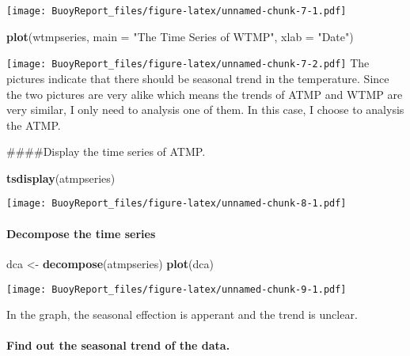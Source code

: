 \documentclass[]{article}
\newenvironment{Shaded}{\begin{snugshade}}{\end{snugshade}}
\newcommand{\DataTypeTok}[1]{\textcolor[rgb]{0.13,0.29,0.53}{#1}}
\newcommand{\KeywordTok}[1]{\textcolor[rgb]{0.13,0.29,0.53}{\textbf{#1}}}
\newcommand{\NormalTok}[1]{#1}
\newcommand{\StringTok}[1]{\textcolor[rgb]{0.31,0.60,0.02}{#1}}
\let\oldparagraph\paragraph
\renewcommand{\paragraph}[1]{\oldparagraph{#1}\mbox{}}
\begin{document}
\texttt{[image: BuoyReport\_files/figure-latex/unnamed-chunk-7-1.pdf]}

\begin{Shaded}
\begin{Highlighting}[]
\KeywordTok{plot}\NormalTok{(wtmpseries, }\DataTypeTok{main =} \StringTok{"The Time Series of WTMP"}\NormalTok{, }\DataTypeTok{xlab =} \StringTok{"Date"}\NormalTok{)}
\end{Highlighting}
\end{Shaded}

\texttt{[image: BuoyReport\_files/figure-latex/unnamed-chunk-7-2.pdf]}
The pictures indicate that there should be seasonal trend in the
temperature. Since the two pictures are very alike which means the
trends of ATMP and WTMP are very similar, I only need to analysis one of
them. In this case, I choose to analysis the ATMP.

\#\#\#\#Display the time series of ATMP.

\begin{Shaded}
\begin{Highlighting}[]
\KeywordTok{tsdisplay}\NormalTok{(atmpseries)}
\end{Highlighting}
\end{Shaded}

\texttt{[image: BuoyReport\_files/figure-latex/unnamed-chunk-8-1.pdf]}

\hypertarget{decompose-the-time-series}{%
\paragraph{Decompose the time series}\label{decompose-the-time-series}}

\begin{Shaded}
\begin{Highlighting}[]
\NormalTok{dca <-}\StringTok{ }\KeywordTok{decompose}\NormalTok{(atmpseries)}
\KeywordTok{plot}\NormalTok{(dca)}
\end{Highlighting}
\end{Shaded}

\texttt{[image: BuoyReport\_files/figure-latex/unnamed-chunk-9-1.pdf]}

In the graph, the seasonal effection is apperant and the trend is
unclear.

\hypertarget{find-out-the-seasonal-trend-of-the-data.}{%
\paragraph{Find out the seasonal trend of the
data.}\label{find-out-the-seasonal-trend-of-the-data.}}
\end{document}
